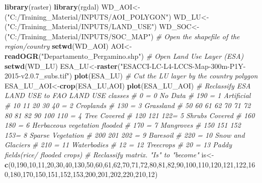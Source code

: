 \documentclass[
  10pt,
  b5paper,
]{book}
\newenvironment{Shaded}{\begin{snugshade}}{\end{snugshade}}
\newcommand{\CommentTok}[1]{\textcolor[rgb]{0.56,0.35,0.01}{\textit{#1}}}
\newcommand{\DecValTok}[1]{\textcolor[rgb]{0.00,0.00,0.81}{#1}}
\newcommand{\KeywordTok}[1]{\textcolor[rgb]{0.13,0.29,0.53}{\textbf{#1}}}
\newcommand{\NormalTok}[1]{#1}
\newcommand{\StringTok}[1]{\textcolor[rgb]{0.31,0.60,0.02}{#1}}
\begin{document}
\begin{Shaded}
\begin{Highlighting}[]
\KeywordTok{library}\NormalTok{(raster)}
\KeywordTok{library}\NormalTok{(rgdal)}
\NormalTok{WD_AOI<-(}\StringTok{"C:/Training_Material/INPUTS/AOI_POLYGON"}\NormalTok{)}
\NormalTok{WD_LU<-(}\StringTok{"C:/Training_Material/INPUTS/LAND_USE"}\NormalTok{)}
\NormalTok{WD_SOC<-(}\StringTok{"C:/Training_Material/INPUTS/SOC_MAP"}\NormalTok{)}
\CommentTok{# Open the shapefile of the region/country}
\KeywordTok{setwd}\NormalTok{(WD_AOI)}
\NormalTok{AOI<-}\KeywordTok{readOGR}\NormalTok{(}\StringTok{"Departamento_Pergamino.shp"}\NormalTok{)}
\CommentTok{# Open Land Use Layer (ESA)}
\KeywordTok{setwd}\NormalTok{(WD_LU)}
\NormalTok{ESA_LU<-}\KeywordTok{raster}\NormalTok{(}\StringTok{"ESACCI-LC-L4-LCCS-Map-300m-P1Y-2015-v2.0.7_subs.tif"}\NormalTok{)}
\KeywordTok{plot}\NormalTok{(ESA_LU)}
\CommentTok{# Cut the LU layer by the country polygon}
\NormalTok{ESA_LU_AOI<-}\KeywordTok{crop}\NormalTok{(ESA_LU,AOI)}
\KeywordTok{plot}\NormalTok{(ESA_LU_AOI)}
\CommentTok{# Reclassify ESA LAND USE to FAO LAND USE classes}
\CommentTok{#     0 = 0   No Data}
\CommentTok{#   190 = 1 Artificial}
\CommentTok{#   10 11 20 30 40 = 2 Croplands}
\CommentTok{#   130 = 3 Grassland}
\CommentTok{#   50 60 61 62 70 71 72 80 81 82 90 100 110 = 4 Tree Covered}
\CommentTok{#   120 121 122= 5 Shrubs Covered}
\CommentTok{#   160 180 = 6 Herbaceous vegetation flooded}
\CommentTok{#   170 = 7 Mangroves}
\CommentTok{#   150 151 152 153= 8 Sparse Vegetation}
\CommentTok{#   200 201 202 = 9 Baresoil}
\CommentTok{#   220 = 10 Snow and Glaciers}
\CommentTok{#   210 = 11 Waterbodies}
\CommentTok{#   12 = 12 Treecrops}
\CommentTok{#   20 = 13 Paddy fields(rice/ flooded crops)}
\CommentTok{# Reclassify matrix. "Is" to "become"}
\NormalTok{is<-}\KeywordTok{c}\NormalTok{(}\DecValTok{0}\NormalTok{,}\DecValTok{190}\NormalTok{,}\DecValTok{10}\NormalTok{,}\DecValTok{11}\NormalTok{,}\DecValTok{20}\NormalTok{,}\DecValTok{30}\NormalTok{,}\DecValTok{40}\NormalTok{,}\DecValTok{130}\NormalTok{,}\DecValTok{50}\NormalTok{,}\DecValTok{60}\NormalTok{,}\DecValTok{61}\NormalTok{,}\DecValTok{62}\NormalTok{,}\DecValTok{70}\NormalTok{,}\DecValTok{71}\NormalTok{,}\DecValTok{72}\NormalTok{,}\DecValTok{80}\NormalTok{,}\DecValTok{81}\NormalTok{,}\DecValTok{82}\NormalTok{,}\DecValTok{90}\NormalTok{,}\DecValTok{100}\NormalTok{,}\DecValTok{110}\NormalTok{,}\DecValTok{120}\NormalTok{,}\DecValTok{121}\NormalTok{,}\DecValTok{122}\NormalTok{,}\DecValTok{160}\NormalTok{,}\DecValTok{180}\NormalTok{,}\DecValTok{170}\NormalTok{,}\DecValTok{150}\NormalTok{,}\DecValTok{151}\NormalTok{,}\DecValTok{152}\NormalTok{,}\DecValTok{153}\NormalTok{,}\DecValTok{200}\NormalTok{,}\DecValTok{201}\NormalTok{,}\DecValTok{202}\NormalTok{,}\DecValTok{220}\NormalTok{,}\DecValTok{210}\NormalTok{,}\DecValTok{12}\NormalTok{)}

\end{Highlighting}
\end{Shaded}
\end{document}
